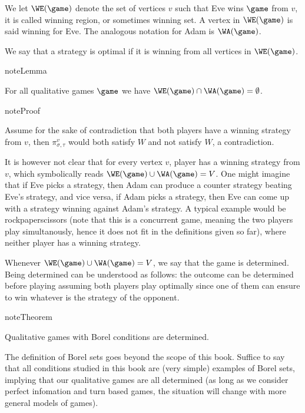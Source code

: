 \documentclass[letterpaper,10pt,english]{sphinxmanual}
\begin{document}
We let \(\WE(\game)\) denote the set of vertices \(v\) such that Eve wins
\(\game\) from \(v\), it is called winning region, or sometimes
winning set. A vertex in \(\WE(\game)\) is said winning for Eve. The
analogous notation for Adam is \(\WA(\game)\).

We say that a strategy is optimal if it is winning from all
vertices in \(\WE(\game)\).

\begin{sphinxadmonition}{note}{Lemma}

For all qualitative games \(\game\) we have
\(\WE(\game) \cap \WA(\game) = \emptyset\).
\end{sphinxadmonition}

\begin{sphinxadmonition}{note}{Proof}

Assume for the sake of contradiction that both players have a
winning strategy from \(v\), then \(\pi^{v}_{\sigma,\tau}\) would both
satisfy \(W\) and not satisfy \(W\), a contradiction.
\end{sphinxadmonition}

It is however not clear that for every vertex \(v\),  player has a
winning strategy from \(v\), which symbolically reads
\(\WE(\game) \cup \WA(\game) = V\). One might imagine that if Eve picks a
strategy, then Adam can produce a counter strategy beating Eve’s
strategy, and vice versa, if Adam picks a strategy, then Eve can come up
with a strategy winning against Adam’s strategy. A typical example would
be rock\sphinxhyphen{}paper\sphinxhyphen{}scissors (note that this is a concurrent game, meaning the
two players play simultanously, hence it does not fit in the definitions
given so far), where neither player has a winning strategy.

Whenever \(\WE(\game) \cup \WA(\game) = V\), we say that the game is
determined. Being determined can be understood as follows: the
outcome can be determined before playing assuming both players play
optimally since one of them can ensure to win whatever is the strategy
of the opponent.

\begin{sphinxadmonition}{note}{Theorem}

Qualitative games with Borel conditions are determined.
\end{sphinxadmonition}

The definition of Borel sets goes beyond the scope of this book. Suffice
to say that all conditions studied in this book are (very simple)
examples of Borel sets, implying that our qualitative games are all
determined (as long as we consider perfect infomation and turn based
games, the situation will change with more general models of games).
\end{document}
